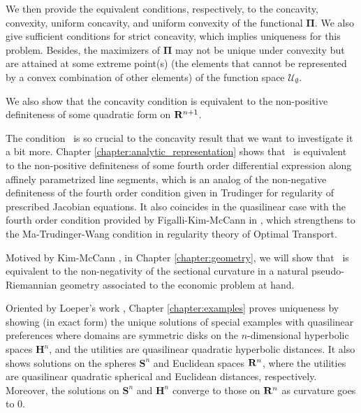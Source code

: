 We then provide the equivalent conditions, respectively, to the concavity, convexity, uniform concavity, and uniform convexity of the functional $\pmb\Pi$. We also give sufficient conditions for strict concavity, which implies uniqueness for this problem. Besides, the maximizers of $\pmb\Pi$ may not be unique under convexity but are attained at some extreme point(s) (the elements that cannot be represented by a convex combination of other elements) of the function space $\mathcal{U}_{\emptyset}$.\medskip 

We also show that the concavity condition is equivalent to the non-positive definiteness of some quadratic form on ${\mathbf R}^{n+1}$. \medskip

The condition \Gthree~is so crucial to the concavity result that we want to investigate it a bit more. Chapter \ref{chapter:analytic_representation} shows that \Gthree~is equivalent to the non-positive definiteness of some fourth order differential expression along affinely parametrized line segments, which is an analog of the non-negative definiteness of the fourth order condition given in Trudinger \cite{Trudinger14} for regularity of prescribed Jacobian equations. It also coincides in the quasilinear case with the fourth order condition provided by Figalli-Kim-McCann in \cite{FigalliKimMcCann11}, which strengthens to the Ma-Trudinger-Wang condition \cite{MaTrudingerWang05} in regularity theory of Optimal Transport.\medskip

Motived by Kim-McCann \cite{KimMcCann10}, in Chapter \ref{chapter:geometry}, we will show that \Gthree~is equivalent to the non-negativity of the sectional curvature in a natural pseudo-Riemannian geometry associated to the economic problem at hand.\medskip




Oriented by Loeper's work \cite{Loeper09}, Chapter \ref{chapter:examples} proves uniqueness by showing (in exact form) the unique solutions of special examples with quasilinear preferences where domains are symmetric disks on the $n$-dimensional hyperbolic spaces $\mathbf{H}^n$, and the utilities are quasilinear quadratic hyperbolic distances. It also shows solutions on the spheres $\mathbf{S}^n$ and Euclidean spaces ${\mathbf R}^n$, where the utilities are quasilinear quadratic spherical and Euclidean distances, respectively. Moreover, the solutions on $\mathbf{S}^n$ and $\mathbf{H}^n$ converge to those on ${\mathbf R}^n$ as curvature goes to $0$.
\medskip






